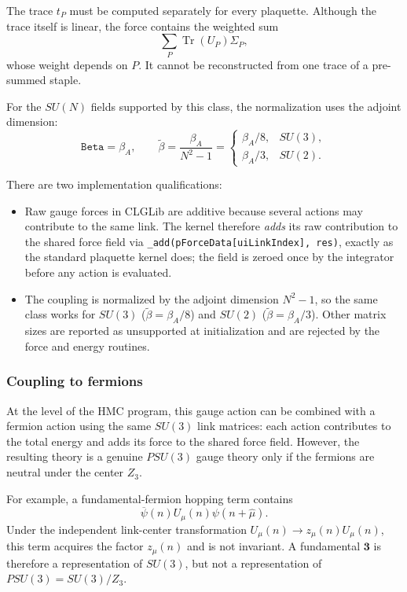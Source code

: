 The trace $t_P$ must be computed separately for every plaquette.  Although
the trace itself is linear, the force contains the weighted sum
\begin{equation}
\sum_P \operatorname{Tr}(U_P)\Sigma_P,
\end{equation}
whose weight depends on $P$.  It cannot be reconstructed from one trace of a
pre-summed staple.

For the $SU(N)$ fields supported by this class, the normalization uses the
adjoint dimension:
\begin{equation}
\texttt{Beta}=\beta_A,
\qquad
\widetilde\beta=\frac{\beta_A}{N^2-1}
=\begin{cases}
\beta_A/8, & SU(3),\\[2pt]
\beta_A/3, & SU(2).
\end{cases}
\end{equation}

There are two implementation qualifications:
\begin{itemize}
\item Raw gauge forces in CLGLib are additive because several actions may
contribute to the same link.  The kernel therefore \emph{adds} its raw
contribution to the shared force field via \texttt{\_add(pForceData[uiLinkIndex], res)},
exactly as the standard plaquette kernel does; the field is zeroed once by the
integrator before any action is evaluated.
\item The coupling is normalized by the adjoint dimension $N^2-1$, so the same
class works for $SU(3)$ ($\widetilde\beta=\beta_A/8$) and $SU(2)$
($\widetilde\beta=\beta_A/3$).  Other matrix sizes are reported as unsupported
at initialization and are rejected by the force and energy routines.
\end{itemize}

\subsubsection{Coupling to fermions}

At the level of the HMC program, this gauge action can be combined with a
fermion action using the same $SU(3)$ link matrices: each action contributes
to the total energy and adds its force to the shared force field.  However,
the resulting theory is a genuine $PSU(3)$ gauge theory only if the fermions
are neutral under the center $Z_3$.

For example, a fundamental-fermion hopping term contains
\begin{equation}
\overline\psi(n)U_\mu(n)\psi(n+\hat\mu).
\end{equation}
Under the independent link-center transformation
$U_\mu(n)\to z_\mu(n)U_\mu(n)$, this term acquires the factor $z_\mu(n)$ and
is not invariant.  A fundamental $\mathbf 3$ is therefore a representation of
$SU(3)$, but not a representation of $PSU(3)=SU(3)/Z_3$.

